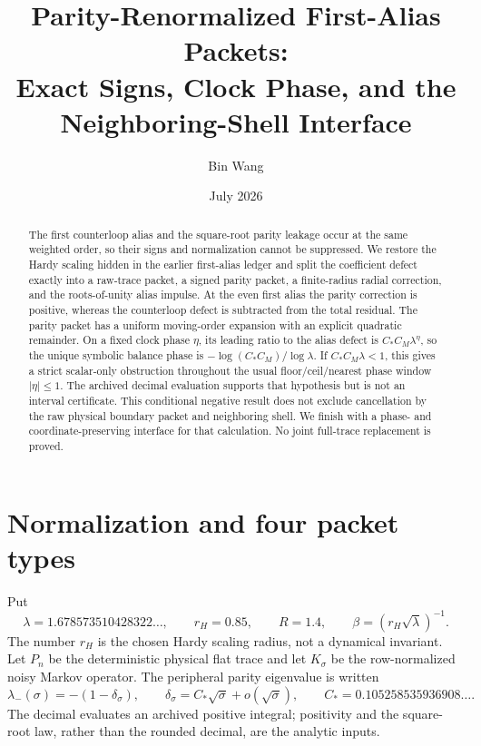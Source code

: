 \documentclass[11pt]{article}
\title{Parity-Renormalized First-Alias Packets:\\Exact Signs, Clock Phase, and the Neighboring-Shell Interface}
\author{Bin Wang}
\date{July 2026}
\theoremstyle{remark}
\newcommand{\1}{\mathbf 1}
\begin{document}
\maketitle

\begin{abstract}
The first counterloop alias and the square-root parity leakage occur at the
same weighted order, so their signs and normalization cannot be suppressed.
We restore the Hardy scaling hidden in the earlier first-alias ledger and
split the coefficient defect exactly into a raw-trace packet, a signed parity
packet, a finite-radius radial correction, and the roots-of-unity alias
impulse.  At the even first alias the parity correction is positive, whereas
the counterloop defect is subtracted from the total residual.  The parity
packet has a uniform moving-order expansion with an explicit quadratic
remainder.  On a fixed clock phase $\eta$, its leading ratio to the alias
defect is $C_*C_M\lambda^\eta$, so the unique symbolic balance phase is
$-\log(C_*C_M)/\log\lambda$.  If $C_*C_M\lambda<1$, this gives a strict
scalar-only obstruction throughout the usual floor/ceil/nearest phase window
$|\eta|\le1$.  The archived decimal evaluation supports that hypothesis but
is not an interval certificate.  This conditional negative result does not
exclude cancellation by the raw physical boundary packet and neighboring
shell.  We finish with a phase- and coordinate-preserving interface for that
calculation.  No joint full-trace replacement is proved.
\end{abstract}

\section{Normalization and four packet types}

Put
\begin{equation}
 \lambda=1.678573510428322\ldots,
 \qquad r_H=0.85,
 \qquad R=1.4,
 \qquad \beta=(r_H\sqrt\lambda)^{-1}.
 \label{eq:constants}
\end{equation}
The number $r_H$ is the chosen Hardy scaling radius, not a dynamical
invariant.  Let $P_n$ be the deterministic physical flat trace and let
$K_\sigma$ be the row-normalized noisy Markov operator.  The peripheral
parity eigenvalue is written
\begin{equation}
 \lambda_-(\sigma)=-(1-\delta_\sigma),
 \qquad
 \delta_\sigma=C_*\sqrt\sigma+o(\sqrt\sigma),
 \qquad
 C_*=0.105258535936908\ldots .
 \label{eq:parity-gap}
\end{equation}
The decimal evaluates an archived positive integral; positivity and the
square-root law, rather than the rounded decimal, are the analytic inputs.
\end{document}
